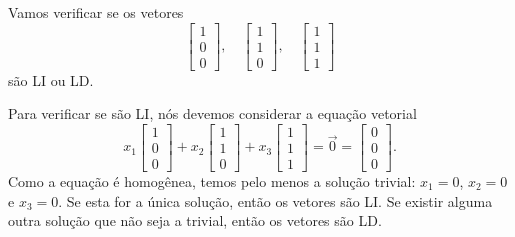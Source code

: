 \begin{ex}\label{exp:1}
Vamos verificar se os vetores
\begin{equation}
\left[
  \begin{array}{c}
    1 \\
    0 \\
    0 
  \end{array}
\right], \quad
\left[
  \begin{array}{c}
    1 \\
    1 \\
    0 
  \end{array}
\right], \quad
\left[
  \begin{array}{c}
    1 \\
    1 \\
    1 
  \end{array}
\right]
\end{equation} são LI ou LD.

Para verificar se são LI, nós devemos considerar a equação vetorial
\begin{equation}
x_1 \left[
  \begin{array}{c}
    1 \\
    0 \\
    0 
  \end{array}
\right] +
x_2\left[
  \begin{array}{c}
    1 \\
    1 \\
    0 
  \end{array}
\right] +
x_3\left[
  \begin{array}{c}
    1 \\
    1 \\
    1 
  \end{array}
\right] = \vec{0} =
\left[
  \begin{array}{c}
    0 \\
    0 \\
    0 
  \end{array}
\right].
\end{equation} Como a equação é homogênea, temos pelo menos a solução trivial: $x_1 = 0$, $x_2=0$ e $x_3 = 0$. Se esta for a única solução, então os vetores são LI. Se existir alguma outra solução que não seja a trivial, então os vetores são LD.


\end{ex}
